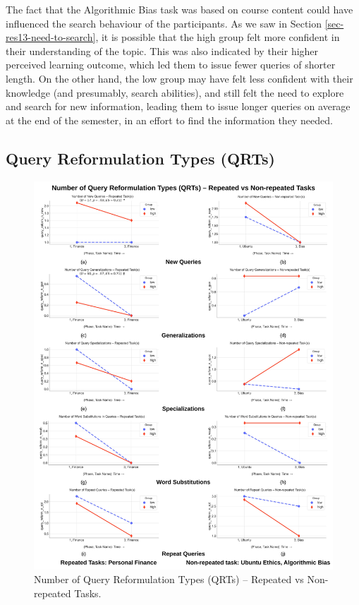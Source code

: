 \documentclass[letterpaper, nobind]{templates/ociamthesis}
\begin{document}
The fact that the Algorithmic Bias task was based on course content could have influenced the search behaviour of the participants.
As we saw in Section \ref{sec-res13-need-to-search}, it is possible that the high group felt more confident in their understanding of the topic.
This was also indicated by their higher perceived learning outcome, which led them to issue fewer queries of shorter length.
On the other hand, the low group may have felt less confident with their knowledge (and presumably, search abilities), and still felt the need to explore and search for new information, leading them to issue longer queries on average at the end of the semester, in an effort to find the information they needed.

\hypertarget{query-reformulation-types-qrts-1}{%
\subsection{Query Reformulation Types (QRTs)}\label{query-reformulation-types-qrts-1}}

\begin{figure}

{\centering \includegraphics[width=1\linewidth]{figs/rp13-qrt} 

}

\caption[Number of Query Reformulation Types (QRTs) -- Repeated vs Non-repeated Tasks.]{Number of Query Reformulation Types (QRTs) -- Repeated vs Non-repeated Tasks.}\label{fig:rp13-qrt}
\end{figure}
\end{document}
